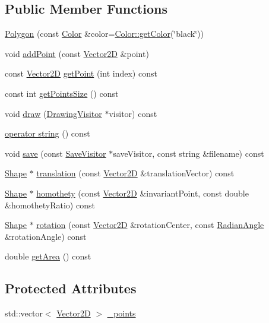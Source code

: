 \subsection*{Public Member Functions}
\begin{DoxyCompactItemize}
\item 
\hyperlink{class_polygon_a9010c30fc3b029a2cc26199c15f915b6}{Polygon} (const \hyperlink{class_color}{Color} \&color=\hyperlink{class_color_a94697e8c9eb81124c5a7c1439e1e7348}{Color\+::get\+Color}(\char`\"{}black\char`\"{}))
\item 
void \hyperlink{class_polygon_a9a5b91783fca1fd154bc97a1e416500b}{add\+Point} (const \hyperlink{class_vector2_d}{Vector2D} \&point)
\item 
const \hyperlink{class_vector2_d}{Vector2D} \hyperlink{class_polygon_ae488fc076f6a3ca6b36ae6217b38195d}{get\+Point} (int index) const
\item 
const int \hyperlink{class_polygon_a07f0c79bf97308da04c7bce322331cab}{get\+Points\+Size} () const
\item 
void \hyperlink{class_polygon_a245c526a6a65ea99f5549fe5243006d0}{draw} (\hyperlink{class_drawing_visitor}{Drawing\+Visitor} $\ast$visitor) const
\item 
\hyperlink{class_polygon_a41c29b75f2463646af0f7bd604a4853d}{operator string} () const
\item 
void \hyperlink{class_polygon_ad9adb867821b71e1aa8130dccbc9b37f}{save} (const \hyperlink{class_save_visitor}{Save\+Visitor} $\ast$save\+Visitor, const string \&filename) const
\item 
\hyperlink{class_shape}{Shape} $\ast$ \hyperlink{class_polygon_ae828addfa5cffab547bcb16db1f275be}{translation} (const \hyperlink{class_vector2_d}{Vector2D} \&translation\+Vector) const
\item 
\hyperlink{class_shape}{Shape} $\ast$ \hyperlink{class_polygon_a2b77c7ecbe9ca68664d7f7020181b791}{homothety} (const \hyperlink{class_vector2_d}{Vector2D} \&invariant\+Point, const double \&homothety\+Ratio) const
\item 
\hyperlink{class_shape}{Shape} $\ast$ \hyperlink{class_polygon_a5a453f01700f97ca98b0487cd670b194}{rotation} (const \hyperlink{class_vector2_d}{Vector2D} \&rotation\+Center, const \hyperlink{class_radian_angle}{Radian\+Angle} \&rotation\+Angle) const
\item 
double \hyperlink{class_polygon_ae1ae9dd5e5613f119af3e31488427b01}{get\+Area} () const
\end{DoxyCompactItemize}
\subsection*{Protected Attributes}
\begin{DoxyCompactItemize}
\item 
std\+::vector$<$ \hyperlink{class_vector2_d}{Vector2D} $>$ \hyperlink{class_polygon_a36bc7384f59aac1a731f1701af587916}{\+\_\+points}
\end{DoxyCompactItemize}
